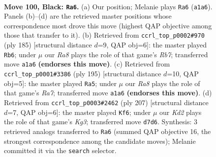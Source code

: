 \documentclass[11pt]{article}
\begin{document}
\clearpage

\begin{figure}[p]\centering
\begin{subfigure}{0.46\textwidth}\centering
\resizebox{\linewidth}{!}{%
\newchessgame
\chessboard[
  setfen={8/3k4/4p3/7R/1R2P3/5PK1/8/r7 b - - 4 100},
  showmover=false,
  pgfstyle=straightmove, color=movearrow, markmove={a1-a6}
]}
\caption{}
\end{subfigure}\hfill
\begin{subfigure}{0.46\textwidth}\centering
\resizebox{\linewidth}{!}{%
\newchessgame
\chessboard[
  setfen={8/8/6pk/R7/7P/6PK/1r6/8 b - - 31 93},
  showmover=false,
  pgfstyle=straightmove, color=movearrow, markmove={b2-b6}
]}
\caption{}
\end{subfigure}
\\[4pt]
\begin{subfigure}{0.46\textwidth}\centering
\resizebox{\linewidth}{!}{%
\newchessgame
\chessboard[
  setfen={8/6k1/7p/8/6P1/5PK1/r7/2R5 b - - 6 98},
  showmover=false,
  pgfstyle=straightmove, color=movearrow, markmove={a2-a5}
]}
\caption{}
\end{subfigure}\hfill
\begin{subfigure}{0.46\textwidth}\centering
\resizebox{\linewidth}{!}{%
\newchessgame
\chessboard[
  setfen={8/8/6kp/R7/5P2/6PK/8/2r5 b - - 24 104},
  showmover=false,
  pgfstyle=straightmove, color=movearrow, markmove={g6-f6}
]}
\caption{}
\end{subfigure}
\caption{\textbf{Move 100, Black: \texttt{Ra6}.} (a) Our position; Melanie plays \texttt{Ra6} (\texttt{a1a6}). Panels (b)--(d) are the retrieved master positions whose correspondence most drove this move (highest QAP objective among those that transfer to it). (b) Retrieved from \texttt{ccrl\_top\_p0002\#970} (ply 185) [structural distance $d$=9, QAP obj=6]: the master played \texttt{Rb6}; under $\mu$ our \emph{Ra8} plays the role of that game's \emph{Rb7}; transferred move \texttt{a1a6} \textbf{(endorses this move)}. (c) Retrieved from \texttt{ccrl\_top\_p0001\#3386} (ply 195) [structural distance $d$=10, QAP obj=5]: the master played \texttt{Ra5}; under $\mu$ our \emph{Ra8} plays the role of that game's \emph{Ra7}; transferred move \texttt{a1a6} \textbf{(endorses this move)}. (d) Retrieved from \texttt{ccrl\_top\_p0003\#2462} (ply 207) [structural distance $d$=7, QAP obj=6]: the master played \texttt{Kf6}; under $\mu$ our \emph{Kd2} plays the role of that game's \emph{Kg3}; transferred move \texttt{d7d6}. Synthesis: 3 retrieved analogs transferred to \texttt{Ra6} (summed QAP objective 16, the strongest correspondence among the candidate moves); Melanie committed it via the \texttt{search} selector.}
\label{fig:thought-m199}
\end{figure}
\end{document}
